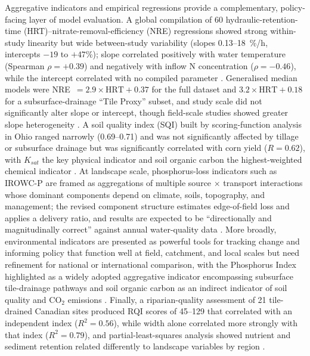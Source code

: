 \documentclass[11pt]{article}
\begin{document}
Aggregative indicators and empirical regressions provide a complementary,
policy-facing layer of model evaluation. A global compilation of 60
hydraulic-retention-time (HRT)--nitrate-removal-efficiency (NRE) regressions
showed strong within-study linearity but wide between-study variability (slopes
0.13--18~\%/h, intercepts $-19$ to $+47$\%); slope correlated positively with
water temperature (Spearman $\rho=+0.39$) and negatively with inflow N
concentration ($\rho=-0.46$), while the intercept correlated with no compiled
parameter \parencite{Christianson2025c}. Generalised median models
were NRE~$=2.9\times\mathrm{HRT}+0.37$ for the full dataset and
$3.2\times\mathrm{HRT}+0.18$ for a subsurface-drainage ``Tile Proxy'' subset, and
study scale did not significantly alter slope or intercept, though field-scale
studies showed greater slope heterogeneity \parencite{Christianson2025c}. A soil
quality index (SQI) built by scoring-function analysis in Ohio ranged narrowly
(0.69--0.71) and was not significantly affected by tillage or subsurface drainage
but was significantly correlated with corn yield ($R=0.62$), with $K_{sat}$ the
key physical indicator and soil organic carbon the highest-weighted chemical
indicator \parencite{Nakajima2015}. At landscape scale, phosphorus-loss
indicators such as IROWC-P are framed as aggregations of multiple source $\times$
transport interactions whose dominant components depend on climate, soils,
topography, and management; the revised component structure estimates
edge-of-field loss and applies a delivery ratio, and results are expected to be
``directionally and magnitudinally correct'' against annual water-quality data
\parencite{Reid2018}. More broadly, environmental indicators are presented as
powerful tools for tracking change and informing policy that function well at
field, catchment, and local scales but need refinement for national or
international comparison, with the Phosphorus Index highlighted as a widely
adopted aggregative indicator encompassing subsurface tile-drainage pathways and
soil organic carbon as an indirect indicator of soil quality and CO$_2$ emissions
\parencite{Zhang2018}. Finally, a riparian-quality assessment of 21 tile-drained
Canadian sites produced RQI scores of 45--129 that correlated with an independent
index ($R^2=0.56$), while width alone correlated more strongly with that index
($R^2=0.79$), and partial-least-squares analysis showed nutrient and sediment
retention related differently to landscape variables by region
\parencite{Terrado2015}.

\printbibliography
\end{document}

